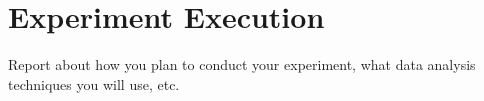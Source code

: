 \section{Experiment Execution}
Report about how you plan to conduct your experiment, what data analysis techniques you will use, etc.

